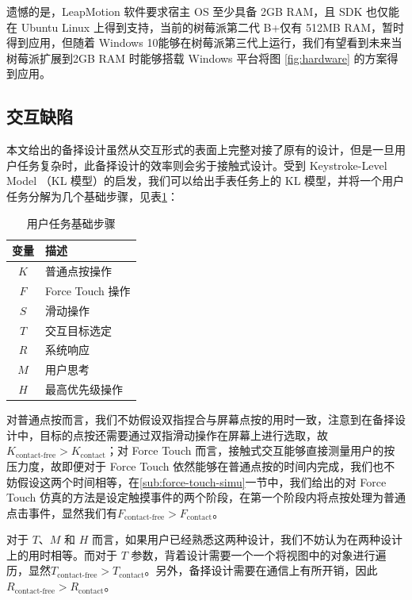 遗憾的是，LeapMotion 软件要求宿主 OS 至少具备 2GB RAM，且 SDK 也仅能在 Ubuntu Linux 上得到支持，当前的树莓派第二代 B+仅有 512MB RAM，暂时得到应用，但随着 Windows 10能够在树莓派第三代上运行，我们有望看到未来当树莓派扩展到2GB RAM 时能够搭载 Windows 平台将图 \ref{fig:hardware} 的方案得到应用。

\subsection{交互缺陷}

本文给出的备择设计虽然从交互形式的表面上完整对接了原有的设计，但是一旦用户任务复杂时，此备择设计的效率则会劣于接触式设计。受到 Keystroke-Level Model （KL 模型）\cite{Card:1980:KMU:358886.358895}的启发，我们可以给出手表任务上的 KL 模型，并将一个用户任务分解为几个基础步骤，见表\ref{table:task}：

\begin{table}[H]
    \small
    \kaishu
    \centering
    \begin{tabular}{c l}
        \toprule
        \textbf{变量}        & \textbf{描述} \\
        \hline
        $K$     & 普通点按操作 \\
        $F$     & Force Touch 操作 \\
        $S$     & 滑动操作 \\
        $T$     & 交互目标选定 \\
        $R$     & 系统响应 \\
        $M$     & 用户思考 \\
        $H$     & 最高优先级操作 \\
        \bottomrule
    \end{tabular}
    \caption{用户任务基础步骤}
    \label{table:task}
\end{table}

对普通点按而言，我们不妨假设双指捏合与屏幕点按的用时一致，注意到在备择设计中，目标的点按还需要通过双指滑动操作在屏幕上进行选取，故$K_{\text{contact-free}}>K_{\text{contact}}$；对 Force Touch 而言，接触式交互能够直接测量用户的按压力度，故即便对于 Force Touch 依然能够在普通点按的时间内完成，我们也不妨假设这两个时间相等，在\ref{sub:force-touch-simu}一节中，我们给出的对 Force Touch 仿真的方法是设定触摸事件的两个阶段，在第一个阶段内将点按处理为普通点击事件，显然我们有$F_{\text{contact-free}}>F_{\text{contact}}$。

对于 $T$、$M$ 和 $H$ 而言，如果用户已经熟悉这两种设计，我们不妨认为在两种设计上的用时相等。而对于 $T$ 参数，背着设计需要一个一个将视图中的对象进行遍历，显然$T_{\text{contact-free}}>T_{\text{contact}}$。另外，备择设计需要在通信上有所开销，因此$R_{\text{contact-free}}>R_{\text{contact}}$。


